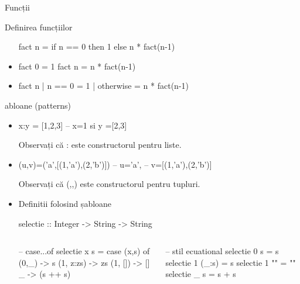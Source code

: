 \documentclass[xcolor=pdftex,romanian,colorlinks]{beamer}
\begin{document}
\begin{section}{Funcții}
\begin{frame}[fragile]{Definirea funcțiilor}
\begin{itemize}
\begin{asciihs}
fact n = if n == 0 then 1
         else n * fact(n-1)
\end{asciihs}
\pause

\item {}

\begin{asciihs}
fact 0 = 1
fact n = n * fact(n-1)
\end{asciihs}
 \pause

\item {}

\begin{asciihs}
fact n
  | n == 0    = 1
  | otherwise = n * fact(n-1)
\end{asciihs}
\end{itemize}
\end{frame}

\begin{frame}[fragile]{\Sh abloane (patterns)}
\begin{itemize}
\item
\begin{asciihs}
x:y = [1,2,3] -- x=1 si y =[2,3]
\end{asciihs}
Observați că { :} este constructorul pentru liste.\pause
\item
\begin{asciihs}
(u,v)=('a',[(1,'a'),(2,'b')]) -- u='a',
                              -- v=[(1,'a'),(2,'b')]
\end{asciihs}
Observați că (,,) este constructorul pentru tupluri.\pause
\item Definitii folosind șabloane
\begin{asciihs}
selectie :: Integer -> String -> String
\end{asciihs}
\vspace{-3ex}
\begin{columns}[t]
  \begin{column}{.45\columnwidth}
\begin{asciihs}
-- case...of
selectie x s =
    case (x,s) of
        (0,_) -> s
        (1, z:zs) -> zs
        (1, []) -> []
        _ -> (s ++ s)
\end{asciihs}
  \end{column}
  \begin{column}{.45\columnwidth}
\begin{asciihs}
-- stil ecuational
selectie 0 s = s
selectie 1 (_:s) = s
selectie 1 "" = ""
selectie _ s = s + s
\end{asciihs}
  \end{column}
\end{columns}


\end{itemize}
\end{frame}
\end{section}
\end{document}
